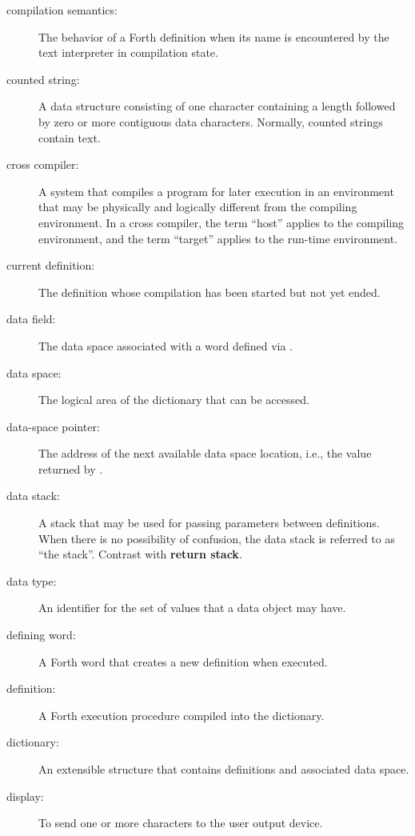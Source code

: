 \begin{description}
\item[compilation semantics:]
	The behavior of a Forth definition when its name is encountered
	by the text interpreter in compilation state.

\item[counted string:]
	A data structure consisting of one character containing a length
	followed by zero or more contiguous data characters. Normally,
	counted strings contain text.

\item[cross compiler:]
	A system that compiles a program for later execution in an
	environment that may be physically and logically different
	from the compiling environment. In a cross compiler, the term
	``host'' applies to the compiling environment, and the term
	``target'' applies to the run-time environment.

\item[current definition:]
	The definition whose compilation has been started but not yet ended.

\item[data field:]
	The data space associated with a word defined via .

\item[data space:]
	The logical area of the dictionary that can be accessed.

\item[data-space pointer:]
	The address of the next available data space location, i.e., the
	value returned by .

\item[data stack:]
	A stack that may be used for passing parameters between
	definitions. When there is no possibility of confusion, the
	data stack is referred to as ``the stack''. Contrast with
	\textbf{return stack}.

\item[data type:]
	An identifier for the set of values that a data object may have.

\item[defining word:]
	A Forth word that creates a new definition when executed.

\item[definition:]
	A Forth execution procedure compiled into the dictionary.

\item[dictionary:]
	An extensible structure that contains definitions and
	associated data space.

\item[display:]
	To send one or more characters to the user output device.


\end{description}
